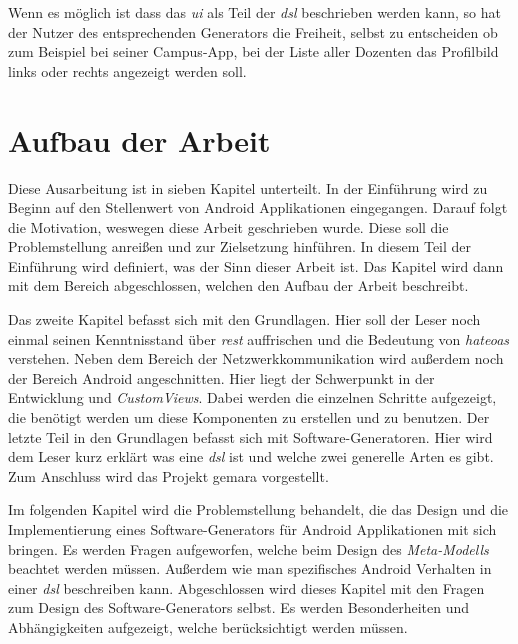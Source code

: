 Wenn es möglich ist dass das \textit{\ac{ui}} als Teil der \textit{\acf{dsl}} beschrieben werden kann, so hat der Nutzer des entsprechenden Generators die Freiheit, selbst zu entscheiden ob zum Beispiel bei seiner Campus-App, bei der Liste aller Dozenten das Profilbild links oder rechts angezeigt werden soll.

\section{Aufbau der Arbeit}\label{sec:structure}
Diese Ausarbeitung ist in sieben Kapitel unterteilt. In der Einführung wird zu Beginn auf den Stellenwert von Android Applikationen eingegangen. Darauf folgt die Motivation, weswegen diese Arbeit geschrieben wurde. Diese soll die Problemstellung anreißen und zur Zielsetzung hinführen. In diesem Teil der Einführung wird definiert, was der Sinn dieser Arbeit ist. Das Kapitel wird dann mit dem Bereich abgeschlossen, welchen den Aufbau der Arbeit beschreibt.

Das zweite Kapitel befasst sich mit den Grundlagen. Hier soll der Leser noch einmal seinen Kenntnisstand über \textit{\acf{rest}} auffrischen und die Bedeutung von \textit{\acf{hateoas}} verstehen. Neben dem Bereich der Netzwerkkommunikation wird außerdem noch der Bereich Android angeschnitten. Hier liegt der Schwerpunkt in der Entwicklung und \textit{CustomViews}. Dabei werden die einzelnen Schritte aufgezeigt, die benötigt werden um diese Komponenten zu erstellen und zu benutzen. Der letzte Teil in den Grundlagen befasst sich mit Software-Generatoren. Hier wird dem Leser kurz erklärt was eine \textit{\acf{dsl}} ist und welche zwei generelle Arten es gibt.
Zum Anschluss wird das Projekt \acf{gemara} vorgestellt. 

Im folgenden Kapitel wird die Problemstellung behandelt, die das Design und die Implementierung eines Software-Generators für Android Applikationen mit sich bringen. Es werden Fragen aufgeworfen, welche beim Design des \textit{Meta-Modells} beachtet werden müssen. Außerdem wie man spezifisches Android Verhalten in einer \textit{\ac{dsl}} beschreiben kann. Abgeschlossen wird dieses Kapitel mit den Fragen zum Design des Software-Generators selbst. Es werden Besonderheiten und Abhängigkeiten aufgezeigt, welche berücksichtigt werden müssen.

